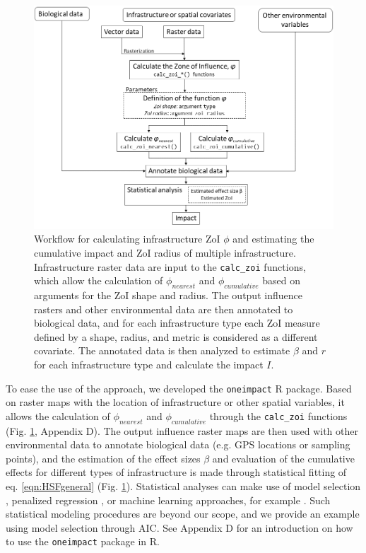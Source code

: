 \documentclass[titlepage]{article}
\begin{document}
\begin{figure}[h]
\centering
\includegraphics[width=1.3\textwidth,center]{figures/figure_workflow.png}
\caption{\label{fig:workflow} Workflow for calculating infrastructure ZoI $\phi$ and estimating the cumulative impact and ZoI radius of multiple infrastructure. Infrastructure raster data are input to the \texttt{calc\_zoi} functions, which allow the calculation 
of $\phi_{nearest}$ and $\phi_{cumulative}$ based on arguments for the ZoI shape and radius. The output influence rasters and other environmental data are then annotated to biological data, and for each infrastructure type each ZoI measure defined by a shape, radius, and metric is considered as a different covariate. The annotated data is then analyzed to estimate $\beta$ and $r$ for each infrastructure type and calculate the impact $I$.}
\end{figure}

To ease the use of the approach, we developed the \verb|oneimpact| R package. Based on raster maps with the location of infrastructure or other spatial variables, it allows the calculation of $\phi_{nearest}$ and $\phi_{cumulative}$ through the \verb|calc_zoi| functions (Fig. \ref{fig:workflow}, Appendix D). The output influence raster maps are then used with other environmental data to annotate biological data (e.g. GPS locations or sampling points), and the estimation of the effect sizes $\beta$ and evaluation of the cumulative effects for different types of infrastructure is made through statistical fitting of eq. \ref{eqn:HSFgeneral} (Fig. \ref{fig:workflow}). Statistical analyses can make use of model selection \citep{burnham_model_2002,huais_multifit_2018}, penalized regression \citep{lee_estimating_2020}, or machine learning approaches, for example \citep{james_introduction_2021}. Such statistical modeling procedures are beyond our scope, and we provide an example using model selection through AIC. See Appendix D for an introduction on how to use the \verb|oneimpact| package in R.
\end{document}
